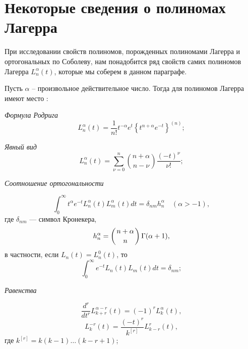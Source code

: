 \section{Некоторые сведения о полиномах Лагерра}
При исследовании свойств полиномов, порожденных полиномами Лагерра и ортогональных по Соболеву,   нам понадобится ряд свойств самих полиномов Лагерра $L_n^\alpha(t)$, которые мы соберем в данном параграфе.

Пусть $\alpha$ -- произвольное действительное число. Тогда для полиномов Лагерра  имеют место \cite{Haar-Tcheb-Sege}:

\textit{Формула Родрига}
\begin{equation}\label{sob-lag-smj-2.1}
L_n^{\alpha}(t) = \frac{1}{n!}t^{-\alpha}e^{t} \left\{ t^{n+\alpha} e^{-t} \right\}^{(n)};
\end{equation}

\textit{Явный вид}
\begin{equation}\label{sob-lag-smj-2.2}
L_n^\alpha(t) =
\sum\limits_{\nu=0}^{n}
\binom{n+\alpha}{n-\nu}
\frac{(-t)^\nu}{\nu!};
\end{equation}

\textit{Соотношение ортогональности}

\begin{equation}
\label{sob-lag-smj-2.3}
\int_0^{\infty} t^{\alpha} e^{-t} L^{\alpha}_{n}(t) L^{\alpha}_{m}(t) dt = \delta_{nm} h^{\alpha}_n \quad (\alpha > -1),
\end{equation}
где $\delta_{nm}$ --- символ Кронекера,
\begin{equation*}\label{sob-lag-smj-2.4}
h^{\alpha}_n = \left( n+\alpha \atop n \right) \Gamma(\alpha +1),
\end{equation*}
в частности, если $L_{n}(t) = L^{0}_{n}(t)$, то
\begin{equation*}
\int_0^{\infty} e^{-t} L_{n}(t) L_{m}(t) dt = \delta_{nm};
\end{equation*}

\textit{ Равенства}

\begin{equation} \label{sob-lag-smj-2.6}
\frac{d^r}{dt^r} L_{k+r}^{\alpha-r}(t) = (-1)^{r} L_{k}^{\alpha}(t),
\end{equation}
\begin{equation}\label{sob-lag-smj-2.7}
L_{k}^{-r}(t) = \frac{(-t)^{r}}{k^{[r]}} L_{k-r}^{r}(t),
\end{equation}
где $k^{[r]} = k(k-1)\ldots(k-r+1)$;



